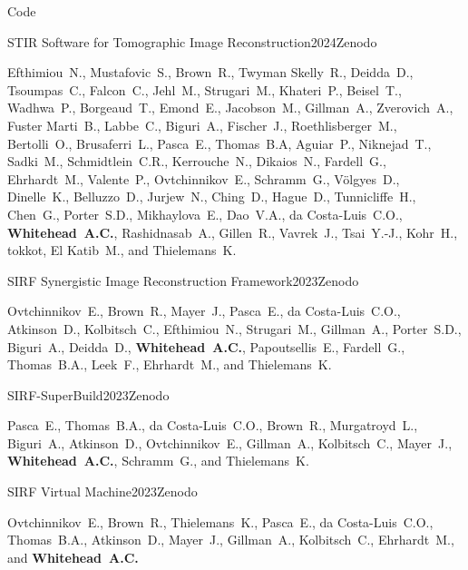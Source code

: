 \documentclass{cv}
\begin{document}
    \begin{rSection}{Code}
        \item \begin{rSubsection}{STIR Software for Tomographic Image Reconstruction}{2024}{Zenodo}{}
            \item Efthimiou~N., Mustafovic~S., Brown~R., Twyman Skelly~R., Deidda~D., Tsoumpas~C., Falcon~C., Jehl~M., Strugari~M., Khateri~P., Beisel~T., Wadhwa~P., Borgeaud~T., Emond~E., Jacobson~M., Gillman~A., Zverovich~A., Fuster Marti~B., Labbe~C., Biguri~A., Fischer~J., Roethlisberger~M., Bertolli~O., Brusaferri~L., Pasca~E., Thomas~B.A, Aguiar~P., Niknejad~T., Sadki~M., Schmidtlein~C.R., Kerrouche~N., Dikaios~N., Fardell~G., Ehrhardt~M., Valente~P., Ovtchinnikov~E., Schramm~G., Völgyes~D., Dinelle~K., Belluzzo~D., Jurjew~N., Ching~D., Hague~D., Tunnicliffe~H., Chen~G., Porter~S.D., Mikhaylova~E., Dao~V.A., da Costa-Luis~C.O., \textbf{Whitehead~A.C.}, Rashidnasab~A., Gillen~R., Vavrek~J., Tsai~Y.-J., Kohr~H., tokkot, El Katib~M., and Thielemans~K.
        \end{rSubsection}
        
        \item \begin{rSubsection}{SIRF Synergistic Image Reconstruction Framework}{2023}{Zenodo}{}
            \item Ovtchinnikov~E., Brown~R., Mayer~J., Pasca~E., da Costa-Luis~C.O., Atkinson~D., Kolbitsch~C., Efthimiou~N., Strugari~M., Gillman~A., Porter~S.D., Biguri~A., Deidda~D., \textbf{Whitehead~A.C.}, Papoutsellis~E., Fardell~G., Thomas~B.A., Leek~F., Ehrhardt~M., and Thielemans~K.
        \end{rSubsection}

        \item \begin{rSubsection}{SIRF-SuperBuild}{2023}{Zenodo}{}
            \item Pasca~E., Thomas~B.A., da Costa-Luis~C.O., Brown~R., Murgatroyd~L., Biguri~A., Atkinson~D., Ovtchinnikov~E., Gillman~A., Kolbitsch~C., Mayer~J., \textbf{Whitehead~A.C.}, Schramm~G., and Thielemans~K.
        \end{rSubsection}
        
        \item \begin{rSubsection}{SIRF Virtual Machine}{2023}{Zenodo}{}
            \item Ovtchinnikov~E., Brown~R., Thielemans~K., Pasca~E., da Costa-Luis~C.O., Thomas~B.A., Atkinson~D., Mayer~J., Gillman~A., Kolbitsch~C., Ehrhardt~M., and \textbf{Whitehead~A.C.}
        \end{rSubsection}
    \end{rSection}
\end{document}
